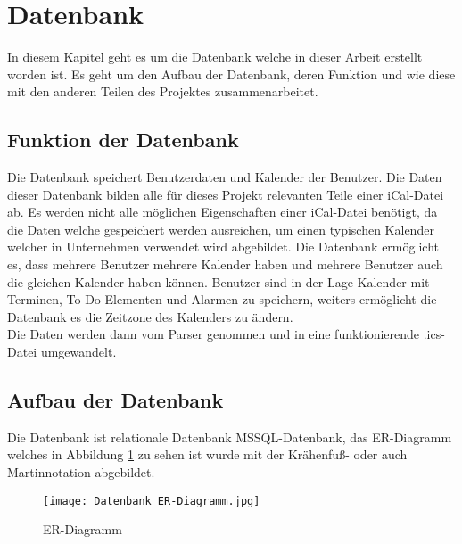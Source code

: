 \renewcommand{\theauthor}{Matthias Franz}
\section{Datenbank}
\label{sec:datenbank}
In diesem Kapitel geht es um die Datenbank welche in dieser Arbeit erstellt worden ist. Es geht um den Aufbau der Datenbank, deren Funktion und wie diese mit den anderen Teilen des Projektes zusammenarbeitet.

\subsection{Funktion der Datenbank}
\label{sec:funktionDatenbank}
Die Datenbank speichert Benutzerdaten und Kalender der Benutzer. Die Daten dieser Datenbank bilden alle für dieses Projekt relevanten Teile einer iCal-Datei ab. Es werden nicht alle möglichen Eigenschaften einer iCal-Datei benötigt, da die Daten welche gespeichert werden ausreichen, um einen typischen Kalender welcher in Unternehmen verwendet wird abgebildet. Die Datenbank ermöglicht es, dass mehrere Benutzer mehrere Kalender haben und mehrere Benutzer auch die gleichen Kalender haben können. Benutzer sind in der Lage Kalender mit Terminen, To-Do Elementen und Alarmen zu speichern, weiters ermöglicht die Datenbank es die Zeitzone des Kalenders zu ändern.
\\
Die Daten werden dann vom Parser genommen und in eine funktionierende .ics-Datei umgewandelt. 

\subsection{Aufbau der Datenbank}
\label{sec:aufbauDatenbank}
Die Datenbank ist relationale Datenbank MSSQL-Datenbank, das ER-Diagramm welches in Abbildung \ref{fig:erDiagramm} zu sehen ist wurde mit der Krähenfuß- oder auch Martinnotation abgebildet.

\pagebreak
\begin{figure}[H]
	\texttt{[image: Datenbank\_ER-Diagramm.jpg]}
    \caption{ER-Diagramm}
    \label{fig:erDiagramm}
\end{figure}
	
\pagebreak